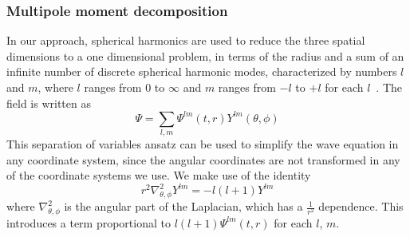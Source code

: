 \subsubsection{Multipole moment decomposition}

In our approach, spherical harmonics are used to reduce the three spatial dimensions to a one dimensional problem, in terms of the radius and a sum of an infinite number of discrete spherical harmonic modes, characterized by numbers $l$ and $m$, where $l$ ranges from $0$ to $\infty$ and  $m$ ranges from $-l$ to $+l$ for each $l$~\cite{poisson_pound_vega_living_review}. The field is written as
\begin{equation}
  \Psi=\sum_{l,m}\Psi^{lm}(t,r)Y^{lm}(\theta,\phi)
\end{equation}
This separation of variables ansatz can be used to simplify the wave equation in any coordinate system, since the angular coordinates are not transformed in any of the coordinate systems we use. We make use of the identity
\begin{equation}
  r^2\nabla_{\theta,\phi}^2Y^{lm}=-l(l+1)Y^{lm}
\end{equation}
where $\nabla_{\theta,\phi}^2$ is the angular part of the Laplacian, which has a $\frac{1}{r^2}$ dependence. This introduces a term proportional to $l(l+1)\Psi^{lm}(t,r)$ for each $l$, $m$. 

